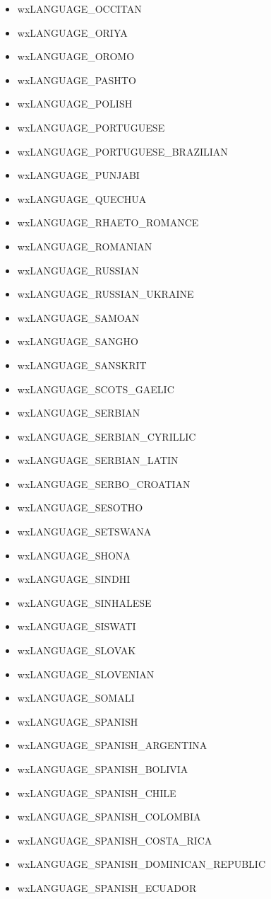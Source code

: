 \begin{itemize}
\item wxLANGUAGE\_OCCITAN
\item wxLANGUAGE\_ORIYA
\item wxLANGUAGE\_OROMO
\item wxLANGUAGE\_PASHTO
\item wxLANGUAGE\_POLISH
\item wxLANGUAGE\_PORTUGUESE
\item wxLANGUAGE\_PORTUGUESE\_BRAZILIAN
\item wxLANGUAGE\_PUNJABI
\item wxLANGUAGE\_QUECHUA
\item wxLANGUAGE\_RHAETO\_ROMANCE
\item wxLANGUAGE\_ROMANIAN
\item wxLANGUAGE\_RUSSIAN
\item wxLANGUAGE\_RUSSIAN\_UKRAINE
\item wxLANGUAGE\_SAMOAN
\item wxLANGUAGE\_SANGHO
\item wxLANGUAGE\_SANSKRIT
\item wxLANGUAGE\_SCOTS\_GAELIC
\item wxLANGUAGE\_SERBIAN
\item wxLANGUAGE\_SERBIAN\_CYRILLIC
\item wxLANGUAGE\_SERBIAN\_LATIN
\item wxLANGUAGE\_SERBO\_CROATIAN
\item wxLANGUAGE\_SESOTHO
\item wxLANGUAGE\_SETSWANA
\item wxLANGUAGE\_SHONA
\item wxLANGUAGE\_SINDHI
\item wxLANGUAGE\_SINHALESE
\item wxLANGUAGE\_SISWATI
\item wxLANGUAGE\_SLOVAK
\item wxLANGUAGE\_SLOVENIAN
\item wxLANGUAGE\_SOMALI
\item wxLANGUAGE\_SPANISH
\item wxLANGUAGE\_SPANISH\_ARGENTINA
\item wxLANGUAGE\_SPANISH\_BOLIVIA
\item wxLANGUAGE\_SPANISH\_CHILE
\item wxLANGUAGE\_SPANISH\_COLOMBIA
\item wxLANGUAGE\_SPANISH\_COSTA\_RICA
\item wxLANGUAGE\_SPANISH\_DOMINICAN\_REPUBLIC
\item wxLANGUAGE\_SPANISH\_ECUADOR

\end{itemize}
